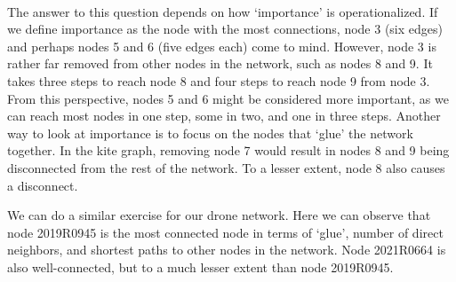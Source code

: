     \begin{center}
    \end{center}
    { \hspace*{\fill} \\}
    
    The answer to this question depends on how `importance' is
operationalized. If we define importance as the node with the most
connections, node 3 (six edges) and perhaps nodes 5 and 6 (five edges
each) come to mind. However, node 3 is rather far removed from other
nodes in the network, such as nodes 8 and 9. It takes three steps to
reach node 8 and four steps to reach node 9 from node 3. From this
perspective, nodes 5 and 6 might be considered more important, as we can
reach most nodes in one step, some in two, and one in three steps.
Another way to look at importance is to focus on the nodes that `glue'
the network together. In the kite graph, removing node 7 would result in
nodes 8 and 9 being disconnected from the rest of the network. To a
lesser extent, node 8 also causes a disconnect.

    We can do a similar exercise for our drone network. Here we can observe
that node 2019R0945 is the most connected node in terms of `glue',
number of direct neighbors, and shortest paths to other nodes in the
network. Node 2021R0664 is also well-connected, but to a much lesser
extent than node 2019R0945.


